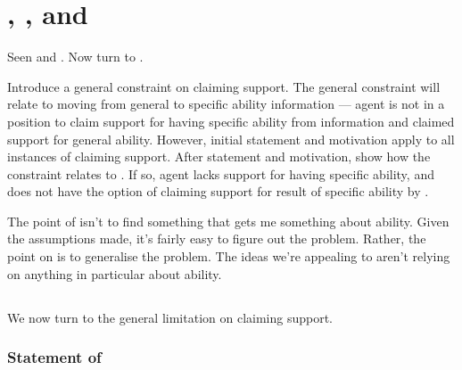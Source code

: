 \chapter{\nI{}, \gsi{}, and }
\label{sec:second-conditional}

\begin{note}
  Seen \ESU{} and \adB{}.
  Now turn to \adA{}.
\end{note}

\begin{note}
  Introduce a general constraint on claiming support.
  The general constraint will relate to moving from general to specific ability information --- agent is not in a position to claim support for having specific ability from information and claimed support for general ability.
  However, initial statement and motivation apply to all instances of claiming support.
  After statement and motivation, show how the constraint relates to \adA{}.
  If so, agent lacks support for having specific ability, and does not have the option of claiming support for result of specific ability by \adA{}.
\end{note}

\begin{note}
  \color{red}
  The point of \nI{} isn't to find something that gets me something about ability.
  Given the assumptions made, it's fairly easy to figure out the problem.
  Rather, the point on \nI{} is to generalise the problem.
  The ideas we're appealing to aren't relying on anything in particular about ability.
\end{note}

\section{\nI{-}}
\label{sec:ni-1}

\begin{note}
  We now turn to the general limitation on claiming support.
\end{note}

\subsection{Statement of \nI{}}

